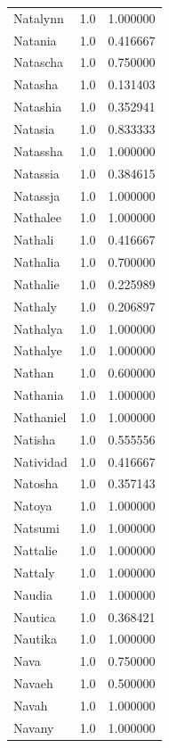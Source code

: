 \documentclass[
  letterpaper,
  DIV=11,
  numbers=noendperiod]{scrreprt}
\begin{document}
\begin{tabular}{lrr}
Natalynn        &   1.0 &   1.000000 \\
Natania         &   1.0 &   0.416667 \\
Natascha        &   1.0 &   0.750000 \\
Natasha         &   1.0 &   0.131403 \\
Natashia        &   1.0 &   0.352941 \\
Natasia         &   1.0 &   0.833333 \\
Natassha        &   1.0 &   1.000000 \\
Natassia        &   1.0 &   0.384615 \\
Natassja        &   1.0 &   1.000000 \\
Nathalee        &   1.0 &   1.000000 \\
Nathali         &   1.0 &   0.416667 \\
Nathalia        &   1.0 &   0.700000 \\
Nathalie        &   1.0 &   0.225989 \\
Nathaly         &   1.0 &   0.206897 \\
Nathalya        &   1.0 &   1.000000 \\
Nathalye        &   1.0 &   1.000000 \\
Nathan          &   1.0 &   0.600000 \\
Nathania        &   1.0 &   1.000000 \\
Nathaniel       &   1.0 &   1.000000 \\
Natisha         &   1.0 &   0.555556 \\
Natividad       &   1.0 &   0.416667 \\
Natosha         &   1.0 &   0.357143 \\
Natoya          &   1.0 &   1.000000 \\
Natsumi         &   1.0 &   1.000000 \\
Nattalie        &   1.0 &   1.000000 \\
Nattaly         &   1.0 &   1.000000 \\
Naudia          &   1.0 &   1.000000 \\
Nautica         &   1.0 &   0.368421 \\
Nautika         &   1.0 &   1.000000 \\
Nava            &   1.0 &   0.750000 \\
Navaeh          &   1.0 &   0.500000 \\
Navah           &   1.0 &   1.000000 \\
Navany          &   1.0 &   1.000000 \\

\end{tabular}
\end{document}
